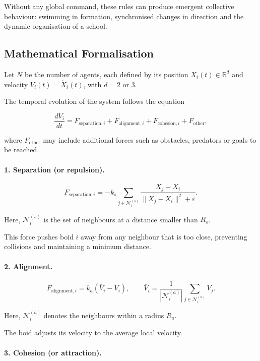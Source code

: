 \documentclass[10pt,a4paper]{article}
\begin{document}
Without any global command, these rules can produce
emergent collective behaviour:
swimming in formation, synchronised changes
in direction and the dynamic organisation
of a school.

\subsection{Mathematical Formalisation}

Let $N$ be the number of agents, each defined
by its position $X_i(t)\in\mathbb{R}^d$
and velocity $V_i(t)=\dot X_i(t)$,
with $d=2$ or $3$.

The temporal evolution of the system follows
the equation

\[
\frac{dV_i}{dt}
=
F_{\mathrm{separation},i}
+
F_{\mathrm{alignment},i}
+
F_{\mathrm{cohesion},i}
+
F_{\mathrm{other}},
\]

where $F_{\mathrm{other}}$ may include additional
forces such as obstacles, predators or goals
to be reached.

\paragraph{1. Separation (or repulsion).}

\[
F_{\mathrm{separation},i}
=
-k_s
\sum_{j\in\mathcal N_i^{(s)}}
\frac{X_j-X_i}
{\|X_j-X_i\|^2+\varepsilon}.
\]

Here, $\mathcal N_i^{(s)}$ is the set of neighbours
at a distance smaller than $R_s$.

This force pushes boid $i$ away from any neighbour
that is too close, preventing collisions and
maintaining a minimum distance.

\paragraph{2. Alignment.}

\[
F_{\mathrm{alignment},i}
=
k_a(\bar V_i-V_i),
\qquad
\bar V_i
=
\frac{1}{|\mathcal N_i^{(a)}|}
\sum_{j\in\mathcal N_i^{(a)}}V_j.
\]

Here, $\mathcal N_i^{(a)}$ denotes the neighbours
within a radius $R_a$.

The boid adjusts its velocity to the average
local velocity.

\paragraph{3. Cohesion (or attraction).}
\end{document}
